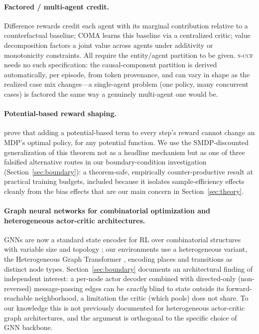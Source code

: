 \documentclass[review,authoryear,3p,times]{elsarticle}
\newcommand{\sccf}{\textsc{s-ccf}}
\begin{document}
\paragraph{Factored / multi-agent credit.} Difference rewards
\citep{difference2002} credit each agent with its marginal contribution
relative to a counterfactual baseline; COMA \citep{coma2018} learns this
baseline via a centralized critic; value decomposition
\citep{vdn2018,qmix2018} factors a joint value across agents under additivity
or monotonicity constraints. All require the entity/agent partition to be
given. \sccf{} needs no such specification: the causal-component partition is
derived automatically, per episode, from token provenance, and can vary in
shape as the realized case mix changes---a single-agent problem (one policy,
many concurrent cases) is factored the same way a genuinely multi-agent one
would be.

\paragraph{Potential-based reward shaping.} \citet{ng1999shaping} prove that
adding a potential-based term to every step's reward cannot change an MDP's
optimal policy, for any potential function. We use the SMDP-discounted
generalization of this theorem not as a headline mechanism but as one of
three falsified alternative routes in our boundary-condition investigation
(Section~\ref{sec:boundary}): a theorem-safe, empirically counter-productive
result at practical training budgets, included because it isolates
sample-efficiency effects cleanly from the bias effects that are our main
concern in Section~\ref{sec:theory}.

\paragraph{Graph neural networks for combinatorial optimization and
heterogeneous actor-critic architectures.} GNNs are now a standard state
encoder for RL over combinatorial structures with variable size and topology
\citep{khalil2017learning,zhang2020jobshop}; our environments use a
heterogeneous variant, the Heterogeneous Graph Transformer
\citep{hu2020hgt}, encoding places and transitions as distinct node types.
Section~\ref{sec:boundary} documents an architectural finding of independent
interest: a per-node actor decoder combined with directed-only (non-reversed)
message-passing edges can be \emph{exactly} blind to state outside its
forward-reachable neighborhood, a limitation the critic (which pools) does
not share. To our knowledge this is not previously documented for
heterogeneous actor-critic graph architectures, and the argument is
orthogonal to the specific choice of GNN backbone.
\end{document}
